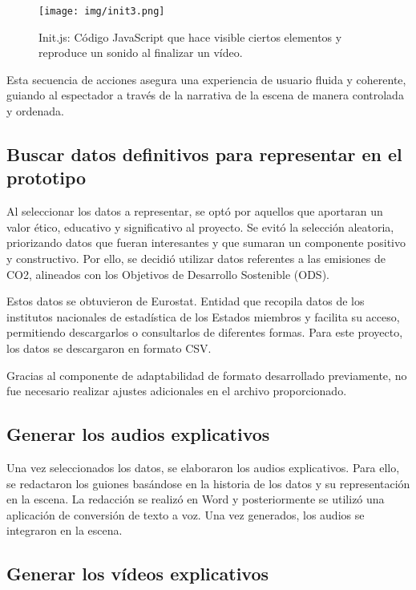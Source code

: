 \documentclass[a4paper, 12pt]{book}
\begin{document}
    \begin{figure}
    \centering
    \texttt{[image: img/init3.png]}
    \caption{Init.js: Código JavaScript que hace visible ciertos elementos y reproduce un sonido al finalizar un vídeo.
}
    \label{fig:init3}
\end{figure}

Esta secuencia de acciones asegura una experiencia de usuario fluida y coherente, guiando al espectador a través de la narrativa de la escena de manera controlada y ordenada.






                
\subsection{Buscar datos definitivos para representar en el prototipo}

Al seleccionar los datos a representar, se optó por aquellos que aportaran un valor ético, educativo y significativo al proyecto. Se evitó la selección aleatoria, priorizando datos que fueran interesantes y que sumaran un componente positivo y constructivo. Por ello, se decidió utilizar datos referentes a las emisiones de CO2, alineados con los Objetivos de Desarrollo Sostenible (ODS).

Estos datos se obtuvieron de Eurostat. Entidad que recopila datos de los institutos nacionales de estadística de los Estados miembros y facilita su acceso, permitiendo descargarlos o consultarlos de diferentes formas. Para este proyecto, los datos se descargaron en formato CSV.

Gracias al componente de adaptabilidad de formato desarrollado previamente, no fue necesario realizar ajustes adicionales en el archivo proporcionado.


\subsection{Generar los audios explicativos}
Una vez seleccionados los datos, se elaboraron los audios explicativos. Para ello, se redactaron los guiones basándose en la historia de los datos y su representación en la escena. La redacción se realizó en Word y posteriormente se utilizó una aplicación de conversión de texto a voz. Una vez generados, los audios se integraron en la escena.

\subsection{Generar los vídeos explicativos}
\end{document}
